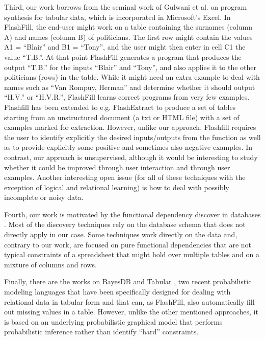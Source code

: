 Third, our work borrows from the seminal work of Gulwani et al. \cite{flashfill} on program synthesis for tabular data, which is incorporated in Microsoft’s Excel. In FlashFill, the end-user might work on a table containing the surnames (column A) and names (column B) of politicians. The first row might contain the values A1 = ``Blair'' and B1 = ``Tony'', and the user might then enter in cell C1 the value ``T.B.''. At that point FlashFill generates a program that produces the output ``T.B.'' for the inputs ``Blair'' and ``Tony'', and also applies it to the other politicians (rows) in the table. While it might need an extra example to deal with names such as ``Van Rompuy, Herman'' and determine whether it should output ``H.V.'' or ``H.V.R.'', FlashFill learns correct programs from very few examples. Flashfill has been extended to e.g. FlashExtract \cite{flashextract} to produce a set of tables starting from an unstructured document (a txt or HTML file) with a set of examples marked for extraction. However, unlike our approach, Flashfill requires the user to identify explicitly the desired inputs/outputs from the function as well as to provide explicitly some positive and sometimes also negative examples.  In contrast, our approach is unsupervised, although it would be interesting to study whether it could be improved through user interaction and through user examples.  Another interesting open issue (for all of these techniques with the exception of logical and relational learning) is how to deal with possibly incomplete or noisy data.

 Fourth, our work is motivated by the functional dependency discover in databases \cite{flach_dependency_discovery}. Most of the discovery techniques rely on the database schema that does not directly apply in our case. Some techniques work directly on the data \cite{tane_dependency_discovery} and, contrary to our work, are focused on pure functional dependencies that are not typical constraints of a spreadsheet that might hold over multiple tables and on a mixture of columns and rows.

Finally, there are the works on  BayesDB \cite{BayesDB} and Tabular \cite{tabular}, two recent probabilistic modeling languages that have been specifically designed for dealing with relational data in tabular form and that can, as FlashFill, also automatically fill out missing values in a table.  However, unlike the other mentioned approaches, it is based on an underlying probabilistic graphical model that performs probabilistic inference rather than identify ``hard'' constraints.

